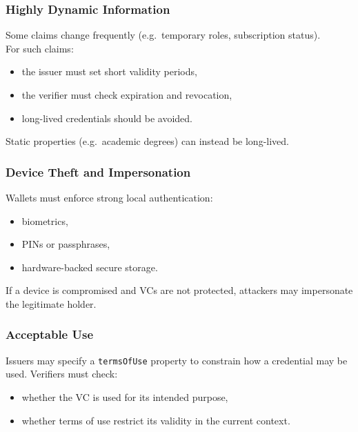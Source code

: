 \vspace{0.4cm}
\subsubsection*{Highly Dynamic Information}

Some claims change frequently (e.g.\ temporary roles, subscription status). \\
For such claims:
\begin{itemize}
    \item the issuer must set short validity periods,
    \item the verifier must check expiration and revocation,
    \item long-lived credentials should be avoided.
\end{itemize}

\noindent
Static properties (e.g.\ academic degrees) can instead be long-lived.

\vspace{0.4cm}
\subsubsection*{Device Theft and Impersonation}

Wallets must enforce strong local authentication:
\begin{itemize}
    \item biometrics,
    \item PINs or passphrases,
    \item hardware-backed secure storage.
\end{itemize}

If a device is compromised and VCs are not protected, attackers may impersonate
the legitimate holder.

\vspace{0.4cm}
\subsubsection*{Acceptable Use}

Issuers may specify a \texttt{termsOfUse} property to constrain how a credential may
be used.  
Verifiers must check:
\begin{itemize}
    \item whether the VC is used for its intended purpose,
    \item whether terms of use restrict its validity in the current context.
\end{itemize}

